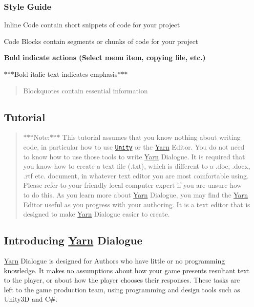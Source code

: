 \subsubsection*{Style Guide}

{\ttfamily Inline Code} contain short snippets of code for your project \begin{DoxyVerb}Code Blocks contain segments or chunks of code for your project
\end{DoxyVerb}


{\bfseries Bold indicate actions (Select menu item, copying file, etc.)}

$\ast$$\ast$$\ast$\-Bold italic text indicates emphasis$\ast$$\ast$$\ast$

\begin{quotation}
Blockquotes contain essential information

\end{quotation}


\subsection*{Tutorial}

\begin{quotation}
$\ast$$\ast$$\ast$\-Note\-:$\ast$$\ast$$\ast$ This tutorial assumes that you know nothing about writing code, in particular how to use \href{http://www.unity3d.com}{\tt Unity} or the \hyperlink{a00045}{Yarn} Editor. You do not need to know how to use those tools to write \hyperlink{a00045}{Yarn} Dialogue. It is required that you know how to create a text file (.txt), which is different to a .doc, .docx, .rtf etc. document, in whatever text editor you are most comfortable using. Please refer to your friendly local computer expert if you are unsure how to do this. As you learn more about \hyperlink{a00045}{Yarn} Dialogue, you may find the \hyperlink{a00045}{Yarn} Editor useful as you progress with your authoring. It is a text editor that is designed to make \hyperlink{a00045}{Yarn} Dialogue easier to create.

\end{quotation}


\subsection*{Introducing \hyperlink{a00045}{Yarn} Dialogue}

\hyperlink{a00045}{Yarn} Dialogue is designed for Authors who have little or no programming knowledge. It makes no assumptions about how your game presents resultant text to the player, or about how the player chooses their responses. These tasks are left to the game production team, using programming and design tools such as Unity3\-D and C\#.

